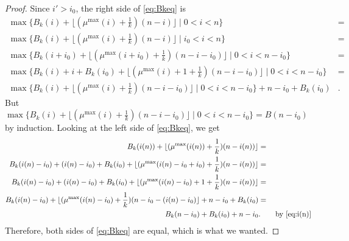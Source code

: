 \documentclass[11pt,reqno]{amsart}
\theoremstyle{plain}
\theoremstyle{definition}
\theoremstyle{remark}
\numberwithin{equation}{section}
\numberwithin{equation}{section}
\begin{document}
\begin{proof}
 Since $i'>i_0$, the right side of \eqref{eq:Bkeq} is
 \begin{align*}
     \max\{B_k(i)+\lfloor(\mu^{\max}(i)+\frac{1}{k})(n-i)\rfloor\mid 0<i<n\}&=\\
     \max\{B_k(i)+\lfloor(\mu^{\max}(i)+\frac{1}{k})(n-i)\rfloor\mid i_0<i<n\}&=\\
     \max\{B_k(i+i_0)+\lfloor(\mu^{\max}(i+i_0)+\frac{1}{k})(n-i-i_0)\rfloor\mid 0<i<n-i_0\}&=\\
    \max\{B_k(i)+i+B_k(i_0)+\lfloor(\mu^{\max}(i)+1+\frac{1}{k})(n-i-i_0)\rfloor\mid 0<i<n-i_0\}&=\\
    \max\{B_k(i)+\lfloor(\mu^{\max}(i)+\frac{1}{k})(n-i-i_0)\rfloor\mid 0<i<n-i_0\}+n-i_0+B_k(i_0)&.
 \end{align*}
 But $\max\{B_k(i)+\lfloor(\mu^{\max}(i)+\frac{1}{k})(n-i-i_0)\rfloor\mid 0<i<n-i_0\}=B(n-i_0)$ by induction. Looking at the left side of \eqref{eq:Bkeq}, we get
 \begin{align*}
     B_k(i(n))+\lfloor(\mu^{\max}(i(n))+\frac{1}{k})(n-i(n))\rfloor&=\\
     B_k(i(n)-i_0)+(i(n)-i_0)+B_k(i_0)+\lfloor(\mu^{\max}(i(n)-i_0+i_0)+\frac{1}{k})(n-i(n))\rfloor&=\\
     B_k(i(n)-i_0)+(i(n)-i_0)+B_k(i_0)+\lfloor(\mu^{\max}(i(n)-i_0)+1+\frac{1}{k})(n-i(n))\rfloor&=\\
    B_k(i(n)-i_0)+\lfloor(\mu^{\max}(i(n)-i_0)+\frac{1}{k})(n-i_0-(i(n)-i_0)\rfloor+n-i_0+B_k(i_0)&=\\
    B_k(n-i_0)+B_k(i_0)+n-i_0&.\qquad\text{by \eqref{eq:i(n)}}
 \end{align*}
 Therefore, both sides of \eqref{eq:Bkeq} are equal, which is what we wanted.
\end{proof}
\end{document}
